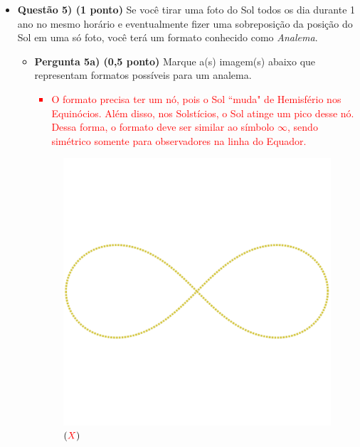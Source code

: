 \documentclass[a4paper, 12pt]{article}
\newcommand{\red}[1]{\textcolor{red}{#1}}
\begin{document}
\begin{flushleft}
\begin{itemize}
		\item \textbf{Questão 5) (1 ponto)} Se você tirar uma foto do Sol todos os dia durante 1 ano no mesmo horário e eventualmente fizer uma sobreposição da posição do Sol em uma só foto, você terá um formato conhecido como \textit{Analema}.
			\begin{itemize}
				\item \textbf{Pergunta 5a) (0,5 ponto)} Marque a(s) imagem(s) abaixo que representam formatos possíveis para um analema.
					\red{\begin{itemize}
						\item O formato precisa ter um nó, pois o Sol ``muda" de Hemisfério nos Equinócios. Além disso, nos Solstícios, o Sol atinge um pico desse nó. Dessa forma, o formato deve ser similar ao símbolo $\infty$, sendo simétrico somente para observadores na linha do Equador.
					\end{itemize}}
					\begin{multicols}{2}
						\begin{figure}[H]
							\centering
							\includegraphics[scale=0.15]{./img/5a.png}
							\captionsetup{labelformat=empty}
							\caption{$(\red{X})$}
						\end{figure}
						\begin{figure}[H]
							\centering

\end{figure}
\end{multicols}
\end{itemize}
\end{itemize}
\end{flushleft}
\end{document}
